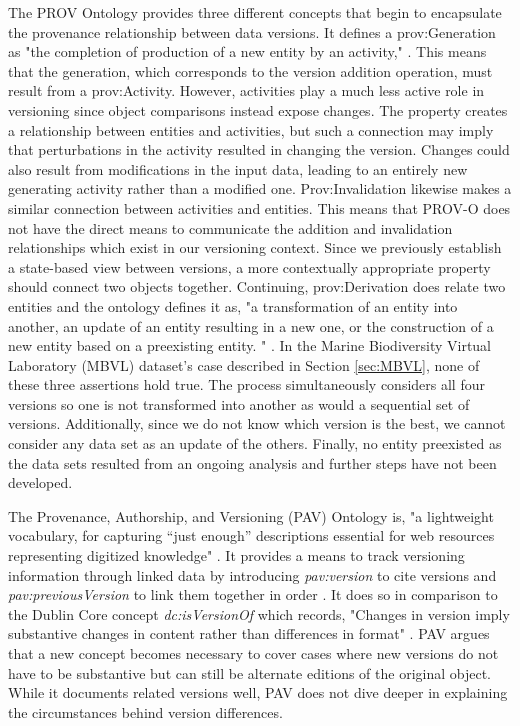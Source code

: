 The PROV Ontology provides three different concepts that begin to encapsulate the provenance relationship between data versions.
It defines a prov:Generation as "the completion of production of a new entity by an activity," \cite{Lebo2013}.
This means that the generation, which corresponds to the version addition operation, must result from a prov:Activity.
However, activities play a much less active role in versioning since object comparisons instead expose changes.
The property creates a relationship between entities and activities, but such a connection may imply that perturbations in the activity resulted in changing the version.
Changes could also result from modifications in the input data, leading to an entirely new generating activity rather than a modified one.
Prov:Invalidation likewise makes a similar connection between activities and entities.
This means that PROV-O does not have the direct means to communicate the addition and invalidation relationships which exist in our versioning context.
Since we previously establish a state-based view between versions, a more contextually appropriate property should connect two objects together.
Continuing, prov:Derivation does relate two entities and the ontology defines it as, "a transformation of an entity into another, an update of an entity resulting in a new one, or the construction of a new entity based on a preexisting entity. " \cite{Lebo2013}.
In the Marine Biodiversity Virtual Laboratory (MBVL) dataset's case described in Section \ref{sec:MBVL}, none of these three assertions hold true. 
The process simultaneously considers all four versions so one is not transformed into another as would a sequential set of versions.
Additionally, since we do not know which version is the best, we cannot consider any data set as an update of the others.
Finally, no entity preexisted as the data sets resulted from an ongoing analysis and further steps have not been developed.

The Provenance, Authorship, and Versioning (PAV) Ontology is, "a lightweight vocabulary, for capturing ``just enough” descriptions essential for web resources representing digitized knowledge" \cite{Ciccarese2013}.
It provides a means to track versioning information through linked data by introducing \textit{pav:version} to cite versions and \textit{pav:previousVersion} to link them together in order \cite{Ciccarese2013}.
It does so in comparison to the Dublin Core concept \textit{dc:isVersionOf} which records, "Changes in version imply substantive changes in content rather than differences in format" \cite{DCMI2012}.
PAV argues that a new concept becomes necessary to cover cases where new versions do not have to be substantive but can still be alternate editions of the original object.
While it documents related versions well, PAV does not dive deeper in explaining the circumstances behind version differences.


